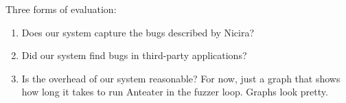 
Three forms of evaluation:

\begin{enumerate}
\item Does our system capture the bugs described by Nicira?
\item Did our system find bugs in third-party applications?
\item Is the overhead of our system reasonable? For now, just a graph that
shows how long it takes to run Anteater in the fuzzer loop. Graphs look
pretty.
\end{enumerate}


